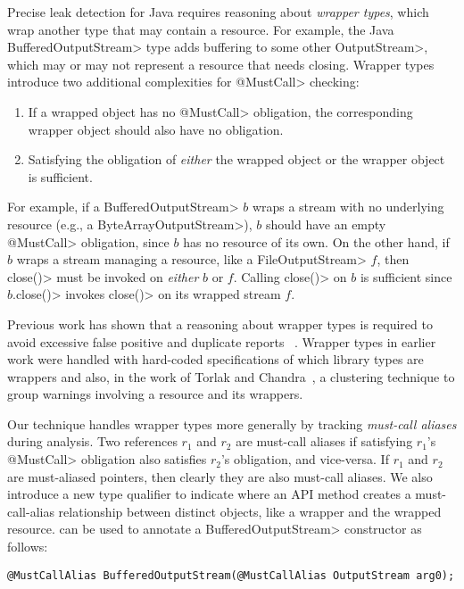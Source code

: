 Precise leak detection for Java requires reasoning about \emph{wrapper types},
which wrap another type that may contain a resource.  For example, the Java
\<BufferedOutputStream> type adds buffering to some other \<OutputStream>, which
may or may not represent a resource that needs closing.  Wrapper types
introduce two additional complexities for \<@MustCall> checking:
\begin{enumerate}
  \item If a wrapped object has no \<@MustCall> obligation, the corresponding
  wrapper object should also have no obligation.
  \item Satisfying the obligation of \emph{either} the wrapped object or the
  wrapper object is sufficient.
\end{enumerate}
For example, if a \<BufferedOutputStream> $b$ wraps a stream with no underlying
resource (e.g., a \<ByteArrayOutputStream>), $b$ should have an empty
\<@MustCall> obligation, since $b$ has no resource of its own.  On the other
hand, if $b$ wraps a stream managing a resource, like a \<FileOutputStream> $f$,
then \<close()> must be invoked on \emph{either} $b$ or $f$. Calling \<close()> on $b$
is sufficient since $b$\<.close()> invokes \<close()> on its wrapped stream $f$.

Previous work has shown that a reasoning about wrapper types is required to
avoid excessive false positive and duplicate reports~\cite{TorlakC10} .  Wrapper types in earlier work were handled with hard-coded specifications of
which library types are wrappers and also, in the work of Torlak and
Chandra~\cite{TorlakC10}, a clustering technique to group warnings involving a
resource and its wrappers.  

Our technique handles wrapper types more generally by tracking \emph{must-call
aliases} during analysis.  Two references $r_1$ and $r_2$ are must-call aliases
if satisfying $r_1$'s \<@MustCall> obligation also satisfies $r_2$'s
obligation, and vice-versa.  If $r_1$ and $r_2$ are must-aliased pointers, then
clearly they are also must-call aliases.  We also introduce a new type
qualifier \mccannot to indicate where an API method creates a must-call-alias
relationship between distinct objects, like a wrapper and the wrapped resource.
\mccannot can be used to annotate a \<BufferedOutputStream> constructor as follows:
\begin{lstlisting}
@MustCallAlias BufferedOutputStream(@MustCallAlias OutputStream arg0);
\end{lstlisting}

